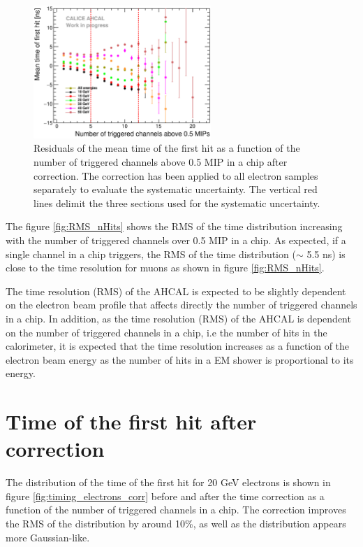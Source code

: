 \begin{figure}[htbp!]
  \centering
  \includegraphics[width=0.6\textwidth]{../Thesis_Plots/Timing/Electrons/Plots/CheckCorrection.eps}
  \caption{Residuals of the mean time of the first hit as a function of the number of triggered channels above 0.5 MIP in a chip after correction. The correction has been applied to all electron samples separately to evaluate the systematic uncertainty. The vertical red lines delimit the three sections used for the systematic uncertainty.}
  \label{fig:Nhit_residuals}
\end{figure}

The figure \ref{fig:RMS_nHits} shows the RMS of the time distribution increasing with the number of triggered channels over 0.5 MIP in a chip. As expected, if a single channel in a chip triggers, the RMS of the time distribution ($\sim$ 5.5 ns) is close to the time resolution for muons as shown in figure \ref{fig:RMS_nHits}.

The time resolution (RMS) of the AHCAL is expected to be slightly dependent on the electron beam profile that affects directly the number of triggered channels in a chip. In addition, as the time resolution (RMS) of the AHCAL is dependent on the number of triggered channels in a chip, i.e the number of hits in the calorimeter, it is expected that the time resolution increases as a function of the electron beam energy as the number of hits in a EM shower is proportional to its energy.

\section{Time of the first hit after correction}
\label{subsec:Electron_Final}

The distribution of the time of the first hit for 20 GeV electrons is shown in figure \ref{fig:timing_electrons_corr} before and after the time correction as a function of the number of triggered channels in a chip. The correction improves the RMS of the distribution by around 10\%, as well as the distribution appears more Gaussian-like.

